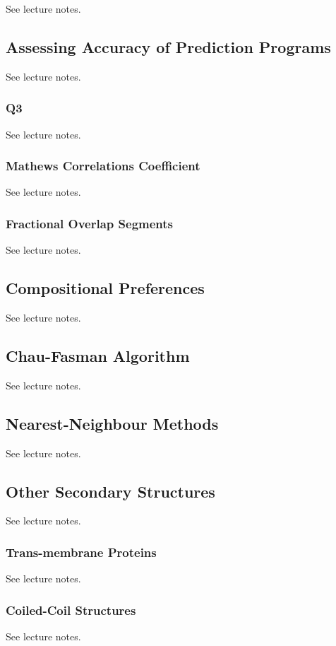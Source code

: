         See lecture notes.\autocite{T8}

    \subsection{Assessing Accuracy of Prediction Programs}

    See lecture notes.\autocite{T8}
        \subsubsection{Q3}
        See lecture notes.\autocite{T8}
        \subsubsection{Mathews Correlations Coefficient}
        See lecture notes.\autocite{T8}
        \subsubsection{Fractional Overlap Segments}
        See lecture notes.\autocite{T8}

    \subsection{Compositional Preferences}
    See lecture notes.\autocite{T8}

    \subsection{Chau-Fasman Algorithm}
    See lecture notes.\autocite{T8}

    \subsection{Nearest-Neighbour Methods}
    See lecture notes.\autocite{T8}

    \subsection{Other Secondary Structures}
    See lecture notes.\autocite{T8}

        \subsubsection{Trans-membrane Proteins}
        See lecture notes.\autocite{T8}

        \subsubsection{Coiled-Coil Structures}
        See lecture notes.\autocite{T8}

